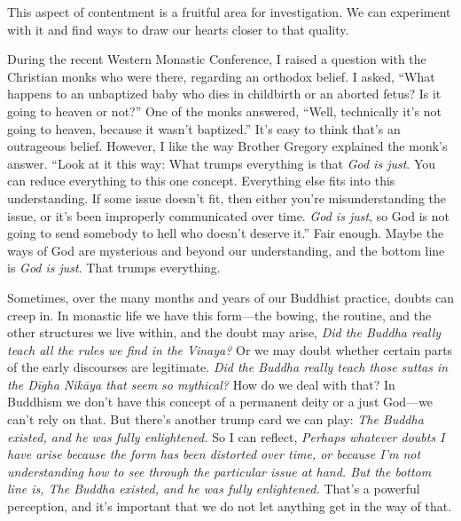 This aspect of contentment is a fruitful area for investigation. We can 
experiment with it and find ways to draw our hearts closer to that 
quality.


During the recent Western Monastic Conference, I raised a question with 
the Christian monks who were there, regarding an orthodox belief. I 
asked, ``What happens to an unbaptized baby who dies in childbirth or 
an aborted fetus? Is it going to heaven or not?'' One of the monks 
answered, ``Well, technically it's not going to heaven, because it 
wasn't baptized.'' It's easy to think that's an outrageous belief. 
However, I like the way Brother Gregory explained the monk's answer. 
``Look at it this way: What trumps everything is that \emph{God is 
just}. You can reduce everything to this one concept. Everything else 
fits into this understanding. If some issue doesn't fit, then either 
you're misunderstanding the issue, or it's been improperly communicated 
over time. \emph{God is just}, so God is not going to send somebody to 
hell who doesn't deserve it.'' Fair enough. Maybe the ways of God are 
mysterious and beyond our understanding, and the bottom line is 
\emph{God is just}. That trumps everything.

Sometimes, over the many months and years of our Buddhist practice, 
doubts can creep in. In monastic life we have this form---the bowing, 
the routine, and the other structures we live within, and the doubt may 
arise, \emph{Did the Buddha really teach all the rules we find in the 
Vinaya?} Or we may doubt whether certain parts of the early discourses 
are legitimate. \emph{Did the Buddha really teach those suttas in the 
Dīgha Nikāya that seem so mythical?} How do we deal with that? In 
Buddhism we don't have this concept of a permanent deity or a just 
God---we can't rely on that. But there's another trump card we can 
play: \emph{The Buddha existed, and he was fully enlightened.} So I can 
reflect, \emph{Perhaps whatever doubts I have arise because the form 
has been distorted over time, or because I'm not understanding how to 
see through the particular issue at hand. But the bottom line is, The 
Buddha existed, and he was fully enlightened.} That's a powerful 
perception, and it's important that we do not let anything get in the 
way of that.

